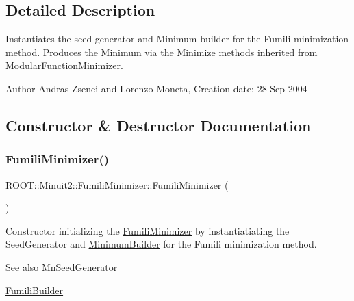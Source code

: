 \subsection{Detailed Description}
Instantiates the seed generator and Minimum builder for the Fumili minimization method. Produces the Minimum via the Minimize methods inherited from \mbox{\hyperlink{classROOT_1_1Minuit2_1_1ModularFunctionMinimizer}{Modular\+Function\+Minimizer}}.

\begin{DoxyAuthor}{Author}
Andras Zsenei and Lorenzo Moneta, Creation date\+: 28 Sep 2004 
\end{DoxyAuthor}


\subsection{Constructor \& Destructor Documentation}
\mbox{\label{classROOT_1_1Minuit2_1_1FumiliMinimizer_af33036073afd0161dbe9fd2fe0866575}} 
\subsubsection{\texorpdfstring{FumiliMinimizer()}{FumiliMinimizer()}\hspace{0.1cm}{\footnotesize\ttfamily [1/2]}}
{\footnotesize\ttfamily R\+O\+O\+T\+::\+Minuit2\+::\+Fumili\+Minimizer\+::\+Fumili\+Minimizer (\begin{DoxyParamCaption}{ }\end{DoxyParamCaption})\hspace{0.3cm}{\ttfamily [inline]}}

Constructor initializing the \mbox{\hyperlink{classROOT_1_1Minuit2_1_1FumiliMinimizer}{Fumili\+Minimizer}} by instantiatiating the Seed\+Generator and \mbox{\hyperlink{classROOT_1_1Minuit2_1_1MinimumBuilder}{Minimum\+Builder}} for the Fumili minimization method.

\begin{DoxySeeAlso}{See also}
\mbox{\hyperlink{classROOT_1_1Minuit2_1_1MnSeedGenerator}{Mn\+Seed\+Generator}}

\mbox{\hyperlink{classROOT_1_1Minuit2_1_1FumiliBuilder}{Fumili\+Builder}} 
\end{DoxySeeAlso}
\mbox{\label{classROOT_1_1Minuit2_1_1FumiliMinimizer_a2e482171de26d153b98228aa41adee3e}} 
